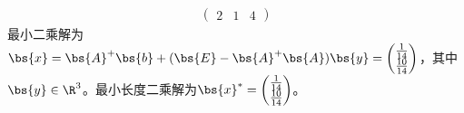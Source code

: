 \documentclass[12pt, a4paper, oneside, UTF8]{ctexbook}
\begin{document}
\begin{solution}
\begin{enumerate}[label=(\arabic*)]
\begin{align*}
\begin{pmatrix}
                2&1&4
            \end{pmatrix}
        \end{align*}
        最小二乘解为$\bs{x}=\bs{A}^+\bs{b}+(\bs{E}-\bs{A}^+\bs{A})\bs{y}
        =\begin{pmatrix}
            \frac{1}{14}\\
            \frac{10}{14}\\
        \end{pmatrix}$，其中$\bs{y}\in \R^3$。最小长度二乘解为$\bs{x}^{*}=\begin{pmatrix}
            \frac{1}{14}\\
            \frac{10}{14}\\
        \end{pmatrix}$。
    \end{enumerate}

\end{solution}


\ifx\allfiles\undefined
\end{document}
